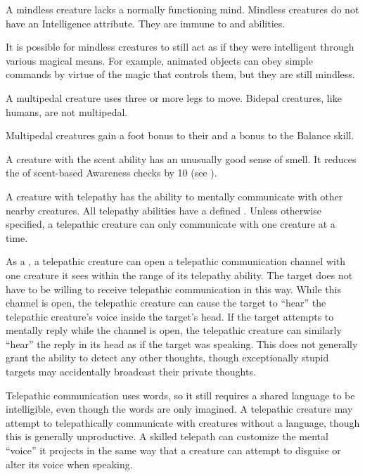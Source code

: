         A mindless creature lacks a normally functioning mind.
        Mindless creatures do not have an Intelligence attribute.
        They are immune to  and  abilities.

        It is possible for mindless creatures to still act as if they were intelligent through various magical means.
        For example, animated objects can obey simple commands by virtue of the magic that controls them, but they are still mindless.

        A multipedal creature uses three or more legs to move.
        Bidepal creatures, like humans, are not multipedal.

        Multipedal creatures gain a  foot bonus to their  and a  bonus to the Balance skill.

        A creature with the scent ability has an unusually good sense of smell.
        It reduces the  of scent-based Awareness checks by 10 (see ).

        A creature with telepathy has the ability to mentally communicate with other nearby creatures.
        All telepathy abilities have a defined .
        Unless otherwise specified, a telepathic creature can only communicate with one creature at a time.

        As a , a telepathic creature can open a telepathic communication channel with one creature it sees within the range of its telepathy ability.
        The target does not have to be willing to receive telepathic communication in this way.
        While this channel is open, the telepathic creature can cause the target to ``hear'' the telepathic creature's voice inside the target's head.
        If the target attempts to mentally reply while the channel is open, the telepathic creature can similarly ``hear'' the reply in its head as if the target was speaking.
        This does not generally grant the ability to detect any other thoughts, though exceptionally stupid targets may accidentally broadcast their private thoughts.

        Telepathic communication uses words, so it still requires a shared language to be intelligible, even though the words are only imagined.
        A telepathic creature may attempt to telepathically communicate with creatures without a language, though this is generally unproductive.
        A skilled telepath can customize the mental ``voice'' it projects in the same way that a creature can attempt to disguise or alter its voice when speaking.

